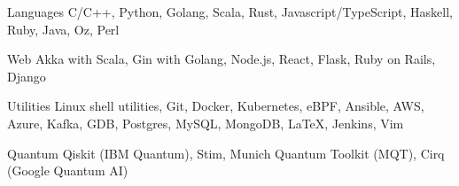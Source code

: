 

\begin{cvskills}


  \cvskill
  {Languages}
  {C/C++, Python, Golang, Scala, Rust, Javascript/TypeScript, Haskell, Ruby, Java, Oz, Perl}


  \cvskill
  {Web}
  {Akka with Scala, Gin with Golang, Node.js, React, Flask, Ruby on Rails, Django}


  \cvskill
  {Utilities}
  {Linux shell utilities, Git, Docker, Kubernetes, eBPF, Ansible, AWS, Azure, Kafka, GDB, Postgres, MySQL, MongoDB, \LaTeX, Jenkins, Vim}


  \cvskill
  {Quantum}
  {Qiskit (IBM Quantum), Stim, Munich Quantum Toolkit (MQT), Cirq (Google Quantum AI)}



\end{cvskills}

